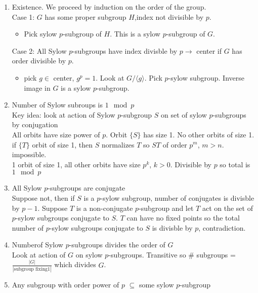 \begin{pf}
    \begin{enumerate}
        \item Existence. We proceed by induction on the order of the group. \\
        Case 1: $G$ has some proper subgroup $H$,index not divisible by $p$. 
        \begin{itemize}
            \item Pick sylow $p$-subgroup of $H$. This is a sylow $p$-subgroup of $G$. 
        \end{itemize}
        Case 2: All Sylow $p$-subgroups have index divisble by $p \to $ center if $G$ has order divisible by $p$. 
        \begin{itemize}
            \item pick $g \in $ center, $g^p=1$. Look at $G / \langle g \rangle $. Pick $p$-sylow subgroup. Inverse image in $G$ is a sylow $p$-subgroup. 
        \end{itemize}
        \item Number of Sylow subroups is $1 \mod p$ \\
        Key idea: look at action of Sylow $p$-subgroup $S$ on set of sylow $p$-subgroups by conjugation \\
        All orbits have size power of $p$. Orbit $\{S\}$ has size 1. No other orbits of size 1. if $\{T\}$ orbit of size 1, then $S$ normalizes $T$ so $ST$ of order $p^m$, $m > n$. impossible. \\
        1 orbit of size 1, all other orbits have size $p^k$, $k > 0$. Divisible by $p$ so total is $1 \mod p$
        \item All Sylow $p$-subgroups are conjugate \\
        Suppose not, then if $S$ is a $p$-sylow subgroup, number of conjugates is divisble by $p-1$. Suppose $T$ is a non-conjugate $p$-subgroup and let $T$ act on the set of $p$-sylow subgroups conjugate to $S$. $T$ can have no fixed points so the total number of $p$-sylow subgroups conjugate to $S$ is divisble by $p$, contradiction. 
        \item Numberof Sylow $p$-subgroups divides the order of $G$ \\
        Look at action of $G$ on sylow $p$-subgroups. Transitive so \# subgroups = $\frac{|G|}{|\text{subgroup fixing} 1|}$ which divides $G$. 
        \item Any subgroup with order power of $p$ $\subseteq$ some sylow $p$-subgroup
    \end{enumerate}
\end{pf}

